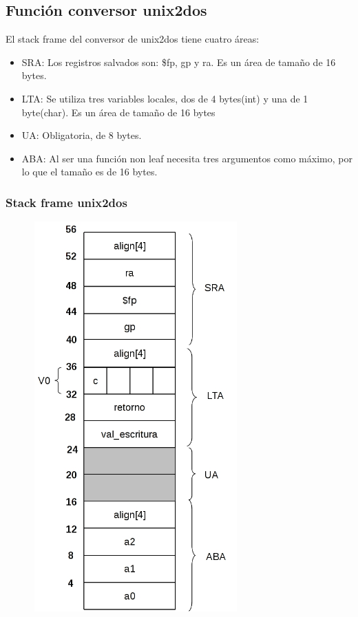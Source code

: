 \documentclass[a4paper,10pt]{article}
\begin{document}
  \subsection{Funci\'on conversor unix2dos}
  El stack frame del conversor de unix2dos tiene cuatro \'areas:
      \begin{itemize}
      \item SRA: Los registros salvados son: \$fp, gp y ra. Es un \'area de tama\~no de 16 bytes.
      \item LTA: Se utiliza tres variables locales, dos de 4 bytes(int) y una de 1 byte(char). Es un \'area de tama\~no de 16 bytes
      \item UA: Obligatoria, de 8 bytes.
      \item ABA: Al ser una funci\'on non leaf necesita tres argumentos como m\'aximo, por lo que el tama\~no es de 16 bytes. 
    \end{itemize}
    \subsubsection{Stack frame unix2dos}
      \begin{center}
	\includegraphics[width=10cm, height=15cm]{DibujosStackFrame/stack-conversor-unix2dos.jpg}
      \end{center}
\end{document}
